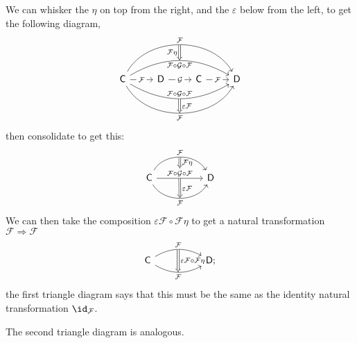 \documentclass[notes.tex]{subfiles}
\begin{document}
We can whisker the $\eta$ on top from the right, and the $\varepsilon$ below from the left, to get the following diagram,
\begin{equation*}
  \begin{tikzcd}
    \mathsf{C}
    \arrow[r, rightarrow, "\mathcal{F}" description]
    \arrow[rrr, rightarrow, bend right=60, swap, "\mathcal{F}"{name=D}]
    \arrow[rrr, rightarrow, bend left=60, "\mathcal{F}"{name=U}]
    \arrow[rrr, rightarrow, bend left=30, swap, "\mathcal{F} \circ \mathcal{G} \circ \mathcal{F}"{name=MU}]
    \arrow[rrr, rightarrow, bend right=30, "\mathcal{F} \circ \mathcal{G} \circ \mathcal{F}"{name=MD}]
    & \mathsf{D}
    \arrow[from=U, to=MU, Rightarrow, swap, "\mathcal{F}\eta"]
    \arrow[r, rightarrow, "\mathcal{G}" description]
    \arrow[from=MD, to=D, Rightarrow, "\varepsilon\mathcal{F}"]
    & \mathsf{C}
    \arrow[r, rightarrow, "\mathcal{F}" description]
    & \mathsf{D}
  \end{tikzcd}
\end{equation*}
then consolidate to get this:
\begin{equation*}
  \begin{tikzcd}[row sep=huge, column sep=huge]
    \mathsf{C}
    \arrow[r, rightarrow, bend left=60, "\mathcal{F}"{name=U}]
    \arrow[r, rightarrow, "\mathcal{F} \circ \mathcal{G} \circ \mathcal{F}"{name=M} description]
    \arrow[r, rightarrow, bend right=60, swap, "\mathcal{F}"{name=D}]
    & \mathsf{D}
    \arrow[from=U, to=M, Rightarrow, "\mathcal{F}\eta"]
    \arrow[from=M, to=D, Rightarrow, "\varepsilon\mathcal{F}"]
  \end{tikzcd}
\end{equation*}
We can then take the composition $\varepsilon \mathcal{F} \circ \mathcal{F}\eta$ to get a natural transformation $\mathcal{F} \Rightarrow \mathcal{F}$
\begin{equation*}
  \begin{tikzcd}[row sep=huge, column sep=huge]
    \mathsf{C}
    \arrow[r, bend left, rightarrow, "\mathcal{F}"{name=U}]
    \arrow[r, bend right, swap, rightarrow, "\mathcal{F}"{name=D}]
    \arrow[from=U, to=D, Rightarrow, "\varepsilon\mathcal{F} \circ \mathcal{F}\eta"]
    &\mathsf{D};
  \end{tikzcd}
\end{equation*}
the first triangle diagram says that this must be the same as the identity natural transformation $\id_{\mathcal{F}}$.

The second triangle diagram is analogous.
\end{document}
